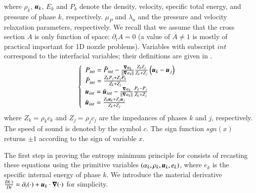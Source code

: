 \documentclass[preprint,10pt]{elsarticle}
\begin{document}
\begin{appendices}
\begin{subequations}
\end{subequations}
where $\rho_k$, $\boldsymbol u_k$, $E_k$ and $P_k$ denote the density, velocity, specific total energy, and pressure of  phase $k$, respectively. $\mu_P$ and $\lambda_u$ and the pressure and velocity relaxation parameters, respectively. We recall that we assume that the cross section $A$ is only function of space: $\partial_t A = 0$ (a value of $A \neq 1$ is mostly of practical important for 1D nozzle problems). 
Variables with subscript ${int}$ correspond to the interfacial variables; their definitions are given in . 
\begin{equation}
\label{eq:sev_equ2-app}
\left\{
\begin{array}{lll}
P_{int} = \bar{P}_{int} - \frac{\boldsymbol\nabla \alpha_k}{|| \boldsymbol\nabla \alpha_k ||} \frac{Z_k Z_j}{Z_k + Z_j} \left( \boldsymbol u_k-\boldsymbol u_j \right) \\
\bar{P}_{int} = \frac{Z_k P_j + Z_j P_k}{Z_k + Z_j} \\
\boldsymbol u_{int} = \bar{\boldsymbol u}_{int} - \frac{\boldsymbol\nabla \alpha_k}{|| \boldsymbol\nabla \alpha_k ||} \frac{P_k - P_j}{Z_k + Z_j} \\
\bar{\boldsymbol u}_{int} = \frac{Z_k \boldsymbol u _k + Z_j \boldsymbol u_j}{Z_k + Z_j}
\end{array}
\right.
\end{equation}
where $Z_k = \rho_k c_k$ and $Z_j = \rho_j c_j$ are the impedances of phases $k$ and $j$, respectively. The speed of sound is denoted by the symbol $c$. The sign function $sgn(x)$ returns $\pm 1$ according to the sign of variable $x$.

The first step in proving the entropy minimum principle for  
consists of recasting these equations using the primitive variables $(\alpha_k, \rho_k, \boldsymbol u_k, e_k)$, where $e_k$ is the specific internal energy of phase $k$. We introduce the material derivative $\frac{D (\cdot)}{Dt} = \partial_t (\cdot) + \boldsymbol u_k \cdot \boldsymbol\nabla (\cdot)$ for simplicity. 


\end{appendices}
\end{document}
